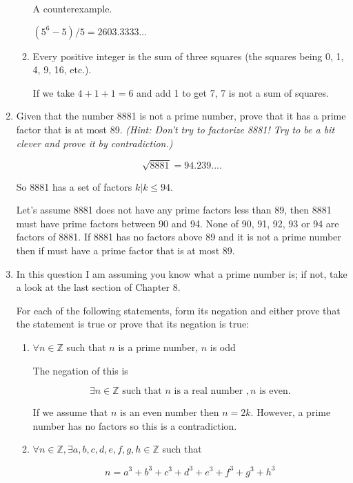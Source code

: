 \documentclass{article}
\begin{document}
\begin{enumerate}
\begin{enumerate}
				A counterexample.
			
				$(5^6 - 5)/5 = 2603.3333 ...$
				
			\item Every positive integer is the sum of three squares (the squares being 0, 1, 4, 9, 16, etc.).
			
				If we take $4 + 1 + 1 = 6$ and add 1 to get 7, 7 is not a sum of squares.
		\end{enumerate}
		
		\item Given that the number 8881 is not a prime number, prove that it has a prime factor that is at most 89.
			\emph{(Hint: Don't try to factorize 8881! Try to be a bit clever and prove it by contradiction.)}
			
			$$\sqrt{8881} = 94.239....$$
			
			So 8881 has a set of factors $k | k \leq 94$.
			
			Let's assume 8881 does not have any prime factors less than 89, then 8881 must have prime factors
			between 90 and 94. None of 90, 91, 92, 93 or 94 are factors of 8881. If 8881 has no factors above 
			89 and it is not a prime number then if must have a prime factor that is at most 89.
			
		\item In this question I am assuming you know what a prime number is; if not, take a look at the last section
		of Chapter 8.
		
		For each of the following statements, form its negation and either prove that the statement is true or prove
		that its negation is true:
		
		\begin{enumerate}
			\item $\forall n \in \mathbb{Z}$ such that $n$ is a prime number, $n$ is odd
			
			The negation of this is
			
			$$\exists n \in \mathbb{Z} \text{ such that } n \text{ is a real number }, n \text{ is even.}$$
			
			If we assume that $n$ is an even number then $n = 2k$. However, a prime number has no factors
			so this is a contradiction.
			
			\item $\forall n \in \mathbb{Z}, \exists a, b, c, d, e, f, g, h \in \mathbb{Z}$ such that
			
				$$n = a^3 + b^3 + c^3 + d^3 + e^3 + f^3 + g^3 + h^3$$
		\end{enumerate}
	
	\end{enumerate}
	

	
\end{document}
